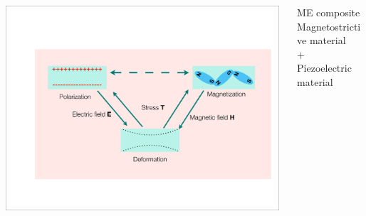 \documentclass[compress]{beamer}
\begin{document}
\begin{frame}
\begin{columns}[totalwidth=\textwidth]
\begin{column}{.65\textwidth}
\includegraphics[width=0.99\textwidth]{Graphic/01_MEcomposite.pdf}
\end{column}
 \begin{column}{.32\textwidth}
 \centering
  \begin{exampleblock}{ME composite} 
  \centering
 Magnetostrictive material \\ [0.1cm]
 {\color{red} \Large$\mathbf{\boldsymbol{+}}$} \\ [0.1cm]
  Piezoelectric material \\ [0.1cm]
  \end{exampleblock}
\end{column}
\end{columns}
\end{frame}
\end{document}

